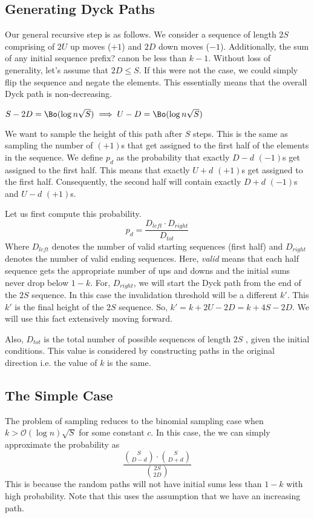 \subsection{Generating Dyck Paths}
Our general recursive step is as follows.
We consider a sequence of length $2S$ comprising of $2U$ up moves ($+1$) and $2D$ down moves ($-1$).
Additionally, the sum of any initial sequence {\color{red} prefix?} canon be less than $k-1$.
Without loss of generality, let's assume that $2D\le S$. If this were not the case,
we could simply flip the sequence and negate the elements.
This essentially means that the overall Dyck path is non-decreasing.

\begin{lemma}
$S-2D = \Bo(\log n\sqrt S) \implies U-D = \Bo(\log n\sqrt S)$
\label{lem:dyck_var0}
\end{lemma}

We want to sample the height of this path after $S$ steps.
This is the same as sampling the number of $(+1)$s that get assigned to the first half of the elements in the sequence.
We define $p_d$ as the probability that exactly $D-d$ $(-1)$s get assigned to the first half.
This means that exactly $U+d$ $(+1)$s get assigned to the first half.
Consequently, the second half will contain exactly $D+d$ $(-1)$s and $U-d$ $(+1)$s.

Let us first compute this probability.
$$
p_d = \frac{D_{left}\cdot D_{right}}{D_{tot}}
$$
Where $D_{left}$ denotes the number of valid starting sequences (first half)
and $D_{right}$ denotes the number of valid ending sequences.
Here, \textit{valid} means that each half sequence gets the appropriate number of ups and downs
and the initial sums never drop below $1-k$.
For, $D_{right}$, we will start the Dyck path from the end of the $2S$ sequence.
In this case the invalidation threshold will be a different $k'$.
This $k'$ is the final height of the $2S$ sequence. So, $k'=k+2U-2D = k+4S-2D$. We will use this fact extensively moving forward.

Also, $D_{tot}$ is the total number of possible sequences of length $2S$ , given the initial conditions.
This value is considered by constructing paths in the original direction i.e. the value of $k$ is the same.

\subsection{The Simple Case}
The problem of sampling reduces to the binomial sampling case when $k > \mathcal{O}(\log n)\sqrt S$ for some constant $c$.
In this case, the we can simply approximate the probability as
$$
\frac{{{S}\choose{D-d}}\cdot{{S}\choose{D+d}}}{{{2S}\choose{2D}}}
$$
This is because the random paths will not have initial sums less than $1-k$ with high probability.
Note that this uses the assumption that we have an increasing path.
